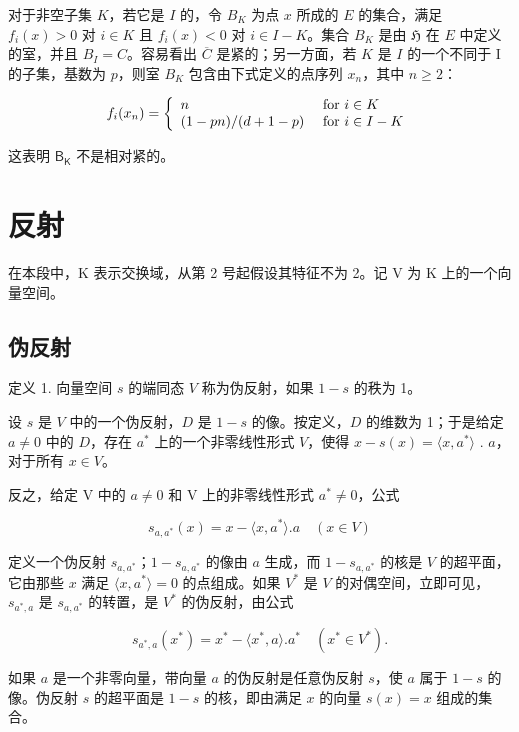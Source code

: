 对于非空子集 \(K\)，若它是 \(I\) 的，令 \(B_K\) 为点 \(x\) 所成的 \(E\) 的集合，满足 \(f_i(x) > 0\) 对 \(i \in K\) 且 \(f_i(x) < 0\) 对 \(i \in I - K\)。集合 \(B_K\) 是由 \(\mathfrak{H}\) 在 \(E\) 中定义的室，并且 \(B_I = C\)。容易看出 \(\overline{C}\) 是紧的；另一方面，若 \(K\) 是 \(I\) 的一个不同于 I 的子集，基数为 \(p\)，则室 \(B_K\) 包含由下式定义的点序列 \(x_n\)，其中 \(n \geqslant 2\)：

\[
f _ {i} (x _ {n}) = \left\{ \begin{array}{l l} n & \text { for } i \in K \\ (1 - p n) / (d + 1 - p) & \text { for } i \in I - K \end{array} \right.
\]

这表明 \(\mathsf{B}_{\mathsf{K}}\) 不是相对紧的。

\section{反射}

在本段中，K 表示交换域，从第 2 号起假设其特征不为 2。记 V 为 K 上的一个向量空间。

\subsection{伪反射}

定义 1. 向量空间 \(s\) 的端同态 \(V\) 称为伪反射，如果 \(1 - s\) 的秩为 1。

设 \(s\) 是 \(V\) 中的一个伪反射，\(D\) 是 \(1 - s\) 的像。按定义，\(D\) 的维数为 1；于是给定 \(a \neq 0\) 中的 \(D\)，存在 \(a^*\) 上的一个非零线性形式 \(V\)，使得 \(x - s(x) = \langle x, a^* \rangle\) . \(a\)，对于所有 \(x \in V\)。

反之，给定 V 中的 \(a \neq 0\) 和 V 上的非零线性形式 \(a^{*} \neq 0\)，公式

\[
s _ {a, a ^ {*}} (x) = x - \langle x, a ^ {*} \rangle . a \quad (x \in V)\tag{1}
\]

定义一个伪反射 \(s_{a,a^*}\)；\(1 - s_{a,a^*}\) 的像由 \(a\) 生成，而 \(1 - s_{a,a^*}\) 的核是 \(V\) 的超平面，它由那些 \(x\) 满足 \(\langle x, a^* \rangle = 0\) 的点组成。如果 \(V^*\) 是 \(V\) 的对偶空间，立即可见，\(s_{a^*,a}\) 是 \(s_{a,a^*}\) 的转置，是 \(V^*\) 的伪反射，由公式

\[
s _ {a ^ {*}, a} (x ^ {*}) = x ^ {*} - \langle x ^ {*}, a \rangle . a ^ {*} \quad (x ^ {*} \in V ^ {*}).\tag{2}
\]

如果 \(a\) 是一个非零向量，带向量 \(a\) 的伪反射是任意伪反射 \(s\)，使 \(a\) 属于 \(1 - s\) 的像。伪反射 \(s\) 的超平面是 \(1 - s\) 的核，即由满足 \(x\) 的向量 \(s(x) = x\) 组成的集合。

